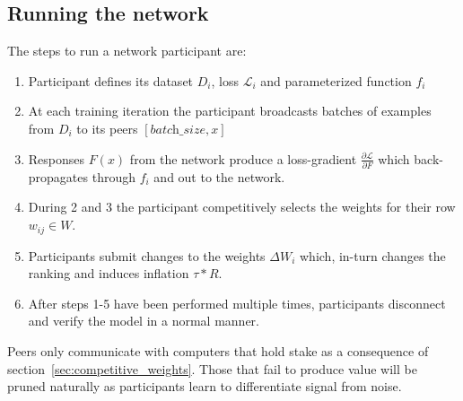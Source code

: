\documentclass{article}
\begin{document}
\subsection{Running the network}

The steps to run a network participant are:
\begin{enumerate}
	
	\item Participant defines its dataset $D_i$, loss $\mathcal{L}_i$ and parameterized function $f_i$
	\item  At each training iteration the participant broadcasts batches of examples from $D_i$ to its peers $[\textit{batch\_size}, x]$
	\item Responses $F(x)$ from the network produce a loss-gradient $\frac{\partial \mathcal{L}}{\partial F}$ which back-propagates through $f_i$ and out to the network.
	\item  During 2 and 3 the participant competitively selects the weights for their row $w_{ij} \in W$.
	\item  Participants submit changes to the weights $\Delta W_i$ which, in-turn changes the ranking and induces inflation $\tau * R$.
	\item  After steps 1-5 have been performed multiple times, participants disconnect and verify the model in a normal manner.
\end{enumerate}

Peers only communicate with computers that hold stake as a consequence of section~\ref{sec:competitive_weights}. Those that fail to produce value will be pruned naturally as participants learn to differentiate signal from noise.



\end{document}
